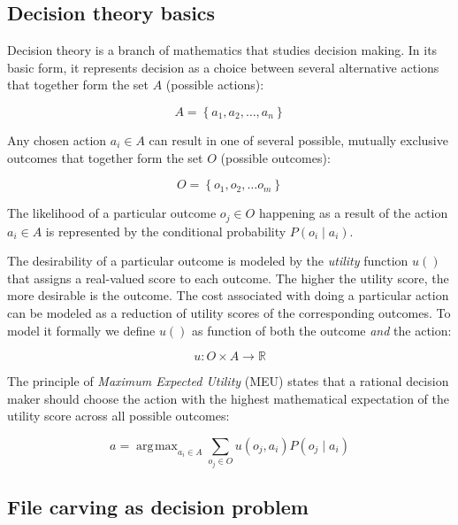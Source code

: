 \documentclass[final,5p,times,twocolumn,authoryear]{elsarticle}
\DeclareMathOperator*{\argmax}{\arg\!\max}
\begin{document}
\subsection{Decision theory basics}

Decision theory is a branch of mathematics that studies decision making. In its basic form, it represents decision as a choice between several alternative actions that together form the set $A$ (possible actions): 

\begin{equation}
A=\left\{a_1,a_2,\dots,a_n\right\}
\end{equation}

Any chosen action $a_i \in A$ can result in one of several possible, mutually exclusive outcomes that together form the set $O$ (possible outcomes):  

\begin{equation}
O=\left\{o_1,o_2,\dots o_m \right\}
\end{equation}

The likelihood of a particular outcome $o_j \in O$ happening as a result of the action $a_i \in A$ is represented by the conditional probability $P(o_i \mid a_i)$. 

The desirability of a particular outcome is modeled by the \emph{utility} function $u()$ that assigns a real-valued score to each outcome. The higher the utility score, the more desirable is the outcome. The cost associated with doing a particular action can be modeled as a reduction of utility scores of the corresponding outcomes. To model it formally we define $u()$ as function of both the outcome \emph{and} the action:

\begin{equation}
u : O \times A \rightarrow \mathbb{R}
\end{equation} 

The principle of \emph{Maximum Expected Utility} (MEU) states that a rational decision maker should choose the action with the highest mathematical expectation of the utility score across all possible outcomes:

\begin{equation} \label{eq:decision}
a = \argmax_{a_i \in A}\sum_{o_j \in O} u(o_j,a_i)P(o_j \mid a_i )
\end{equation}

\subsection{File carving as decision problem}
\end{document}
